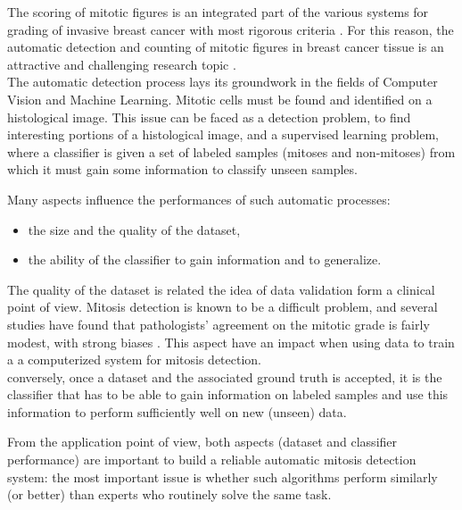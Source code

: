 \vspace{0.2cm}

The scoring of mitotic figures is an integrated part of the various systems for grading of invasive breast cancer with most rigorous criteria \cite{breastCancerGrading01}.
For this reason, the automatic detection and counting of mitotic figures in breast cancer tissue is an attractive and challenging research
topic \cite{Mitosis01}.\\
The automatic detection process lays its groundwork in the fields of Computer Vision and Machine Learning\cite{mitosisBreastCancerImagingAlgorithmsTHESIS}.
Mitotic cells must be found and identified on a histological image. This issue can be faced as a
detection problem, to find interesting portions of a histological image, and a supervised learning problem, where a classifier
is given a set of labeled samples (mitoses and non-mitoses) from which it must gain some information to classify unseen samples.\\

\clearpage

Many aspects influence the performances of such automatic processes:

\begin{itemize}
 \item the size and the quality of the dataset,
 \item the ability of the classifier to gain information and to generalize.
\end{itemize}

The quality of the dataset is related the idea of data validation form a clinical point of view. Mitosis detection is known to be
a difficult problem, and several studies have found that pathologists' agreement on the mitotic grade is fairly modest, with strong biases \cite{mitoticRecognition03Agreement}.
This aspect have an impact when using data to train a a computerized system for mitosis detection.\\
conversely, once a dataset and the associated ground truth is accepted, it is the classifier that has to be able to gain information on labeled samples and
use this information to perform sufficiently well on new (unseen) data.

\vspace{0.5cm}

From the application point of view, both aspects (dataset and classifier performance) are important to build a reliable automatic mitosis detection system:
the most important issue is whether such algorithms perform similarly (or better) than experts who routinely solve the same task.

